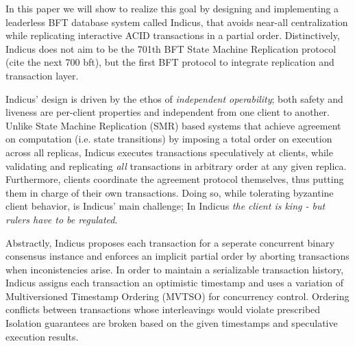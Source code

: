 In this paper we will show to realize this goal by designing and implementing a leaderless BFT database system called Indicus, that avoids near-all centralization while replicating interactive ACID transactions in a partial order. Distinctively, Indicus does not aim to be the 701th BFT State Machine Replication protocol (cite the next 700 bft), but the first BFT protocol to integrate replication and transaction layer.

Indicus' design is driven by the ethos of \textit{independent operability}; both safety  and liveness  are per-client properties and independent from one client to another.
 Unlike State Machine Replication (SMR) based systems that achieve agreement on computation (i.e. state transitions) by imposing a total order on execution across all replicas, Indicus executes transactions speculatively at clients, while validating and replicating \textit{all} transactions in arbitrary order at any given replica. Furthermore, clients coordinate the agreement protocol themselves, thus putting them in charge of their own transactions. Doing so, while tolerating byzantine client behavior, is Indicus' main challenge; In Indicus \textit{the client is king - but rulers have to be regulated}.

Abstractly, Indicus proposes each transaction for a seperate concurrent binary consensus instance and enforces an implicit partial order by aborting transactions when inconistencies arise. In order to maintain a serializable transaction history, Indicus assigns each transaction an optimistic timestamp and uses a variation of Multiversioned Timestamp Ordering (MVTSO) for concurrency control. Ordering conflicts between transactions whose interleavings would violate prescribed Isolation guarantees are broken based on the given timestamps and speculative execution results. \\



